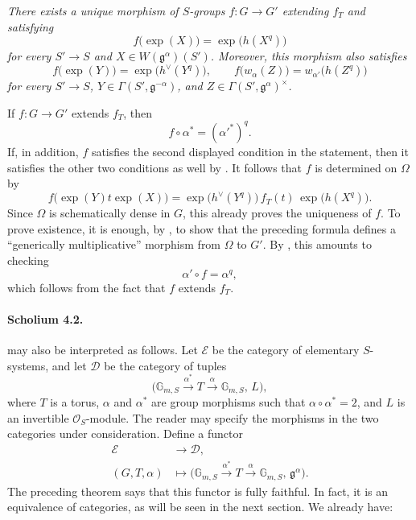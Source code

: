 \emph{There exists a unique morphism of \(S\)-groups
\(f\colon G\to G'\) extending \(f_T\) and satisfying}
\[
  f\bigl(\exp(X)\bigr)=\exp\bigl(h(X^q)\bigr)
\]
\emph{for every \(S'\to S\) and
\(X\in W(\mathfrak g^\alpha)(S')\).  Moreover, this morphism also
satisfies}
\[
  f\bigl(\exp(Y)\bigr)=\exp\bigl(h^\vee(Y^q)\bigr),
  \qquad
  f\bigl(w_\alpha(Z)\bigr)
    =w_{\alpha'}\bigl(h(Z^q)\bigr)
\]
\emph{for every \(S'\to S\),
\(Y\in\Gamma(S',\mathfrak g^{-\alpha})\), and
\(Z\in\Gamma(S',\mathfrak g^\alpha)^\times\).}

If \(f\colon G\to G'\) extends \(f_T\), then
\[
  f\circ\alpha^\ast=(\alpha'^\ast)^q.
\]
If, in addition, \(f\) satisfies the second displayed condition in
the statement, then it satisfies the other two conditions as well by
.  It follows that \(f\) is determined on \(\Omega\) by
\[
  f\bigl(\exp(Y)t\exp(X)\bigr)
  =
  \exp\bigl(h^\vee(Y^q)\bigr)\,
  f_T(t)\,
  \exp\bigl(h(X^q)\bigr).
\]
Since \(\Omega\) is schematically dense in \(G\), this already proves
the uniqueness of \(f\).  To prove existence, it is enough, by
, to show that the preceding formula defines a
``generically multiplicative'' morphism from \(\Omega\) to \(G'\).
By , this amounts to checking
\[
  \alpha'\circ f=\alpha^q,
\]
which follows from the fact that \(f\) extends \(f_T\).

\paragraph{\textbf{Scholium 4.2.}}
 may also be interpreted as follows.  Let
\(\mathcal E\) be the category of elementary \(S\)-systems, and let
\(\mathcal D\) be the category of tuples
\[
  \bigl(
    \mathbb G_{m,S}\xrightarrow{\alpha^\ast}T
    \xrightarrow{\alpha}\mathbb G_{m,S},\,L
  \bigr),
\]
where \(T\) is a torus, \(\alpha\) and \(\alpha^\ast\) are group
morphisms such that \(\alpha\circ\alpha^\ast=2\), and \(L\) is an
invertible \(\mathcal O_S\)-module.  The reader may specify the
morphisms in the two categories under consideration.  Define a
functor
\[
\begin{aligned}
  \mathcal E&\longrightarrow\mathcal D,\\
  (G,T,\alpha)&\longmapsto
  \bigl(
    \mathbb G_{m,S}\xrightarrow{\alpha^\ast}T
    \xrightarrow{\alpha}\mathbb G_{m,S},\,
    \mathfrak g^\alpha
  \bigr).
\end{aligned}
\]
The preceding theorem says that this functor is fully faithful.  In
fact, it is an equivalence of categories, as will be seen in the next
section.  We already have:

